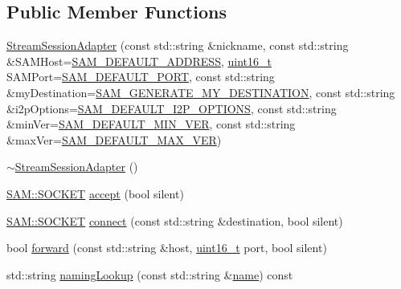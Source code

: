 \subsection*{Public Member Functions}
\begin{DoxyCompactItemize}
\item 
\hyperlink{class_s_a_m_1_1_stream_session_adapter_aa2c9e13fcfa6570af80d387b3fc5704c}{Stream\+Session\+Adapter} (const std\+::string \&nickname, const std\+::string \&S\+A\+M\+Host=\hyperlink{i2psam_8h_a0a23b2412e2cddafabcca92a35671854}{S\+A\+M\+\_\+\+D\+E\+F\+A\+U\+L\+T\+\_\+\+A\+D\+D\+R\+E\+S\+S}, \hyperlink{stdint_8h_a273cf69d639a59973b6019625df33e30}{uint16\+\_\+t} S\+A\+M\+Port=\hyperlink{i2psam_8h_a21f3ab7f14d3db851db9d30698abbc15}{S\+A\+M\+\_\+\+D\+E\+F\+A\+U\+L\+T\+\_\+\+P\+O\+R\+T}, const std\+::string \&my\+Destination=\hyperlink{i2psam_8h_a7106d11b70e8d692b4f3ee6cbac5d1f1}{S\+A\+M\+\_\+\+G\+E\+N\+E\+R\+A\+T\+E\+\_\+\+M\+Y\+\_\+\+D\+E\+S\+T\+I\+N\+A\+T\+I\+O\+N}, const std\+::string \&i2p\+Options=\hyperlink{i2psam_8h_a27b1654d5365d0ef151d0a185b4aea36}{S\+A\+M\+\_\+\+D\+E\+F\+A\+U\+L\+T\+\_\+\+I2\+P\+\_\+\+O\+P\+T\+I\+O\+N\+S}, const std\+::string \&min\+Ver=\hyperlink{i2psam_8h_a6d69841635f067c7d798c07286cc09f0}{S\+A\+M\+\_\+\+D\+E\+F\+A\+U\+L\+T\+\_\+\+M\+I\+N\+\_\+\+V\+E\+R}, const std\+::string \&max\+Ver=\hyperlink{i2psam_8h_a37975b7aa109cc3353552fa5e69236d0}{S\+A\+M\+\_\+\+D\+E\+F\+A\+U\+L\+T\+\_\+\+M\+A\+X\+\_\+\+V\+E\+R})
\item 
\hyperlink{class_s_a_m_1_1_stream_session_adapter_abf40bd7ca543e91544ebd4c03fd8d702}{$\sim$\+Stream\+Session\+Adapter} ()
\item 
\hyperlink{namespace_s_a_m_a346e18b1c3780d27cc960b8a432dfdf7}{S\+A\+M\+::\+S\+O\+C\+K\+E\+T} \hyperlink{class_s_a_m_1_1_stream_session_adapter_a040e02aced837c8409ed1edfc4f8ac69}{accept} (bool silent)
\item 
\hyperlink{namespace_s_a_m_a346e18b1c3780d27cc960b8a432dfdf7}{S\+A\+M\+::\+S\+O\+C\+K\+E\+T} \hyperlink{class_s_a_m_1_1_stream_session_adapter_a983b84796d46f00aee1e4b7c4f6f421f}{connect} (const std\+::string \&destination, bool silent)
\item 
bool \hyperlink{class_s_a_m_1_1_stream_session_adapter_a1ebd1d55194db5bbed563836f06a2b55}{forward} (const std\+::string \&host, \hyperlink{stdint_8h_a273cf69d639a59973b6019625df33e30}{uint16\+\_\+t} port, bool silent)
\item 
std\+::string \hyperlink{class_s_a_m_1_1_stream_session_adapter_a865f56708a911fc832953f10c59d96e3}{naming\+Lookup} (const std\+::string \&\hyperlink{testharness_8cc_a8f8f80d37794cde9472343e4487ba3eb}{name}) const 

\end{DoxyCompactItemize}
